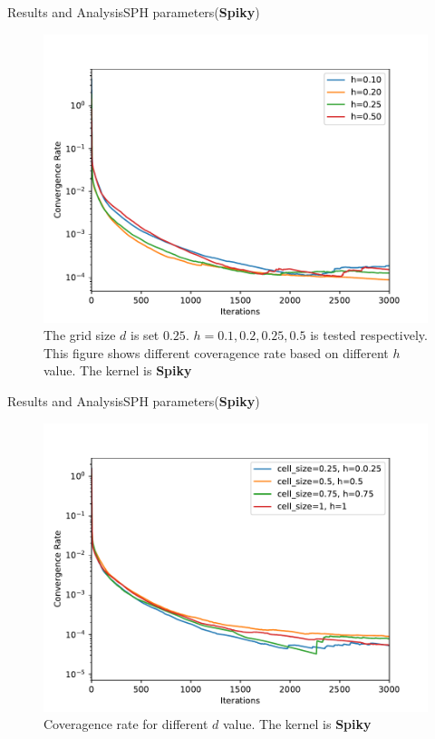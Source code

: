 \documentclass{beamer}
\begin{document}
\begin{frame}{Results and Analysis}{SPH parameters(\textbf{Spiky})}
\begin{figure}[!ht]
    \centering
    \includegraphics[scale=0.4]{../report/Figures/spiky25.pdf}
    \caption{The grid size $d$ is set $0.25$. $h=0.1, 0.2, 0.25, 0.5$ is tested respectively. This figure shows different coveragence rate based on different $h$ value. The kernel is \textbf{Spiky}}
\end{figure}
\end{frame}
\begin{frame}{Results and Analysis}{SPH parameters(\textbf{Spiky})}
\begin{figure}[!ht]
    \centering
    \includegraphics[scale=0.4]{../report/Figures/spikysize.pdf}
    \caption{Coveragence rate for different $d$ value. The kernel is \textbf{Spiky}}
\end{figure}
\end{frame}
\end{document}
